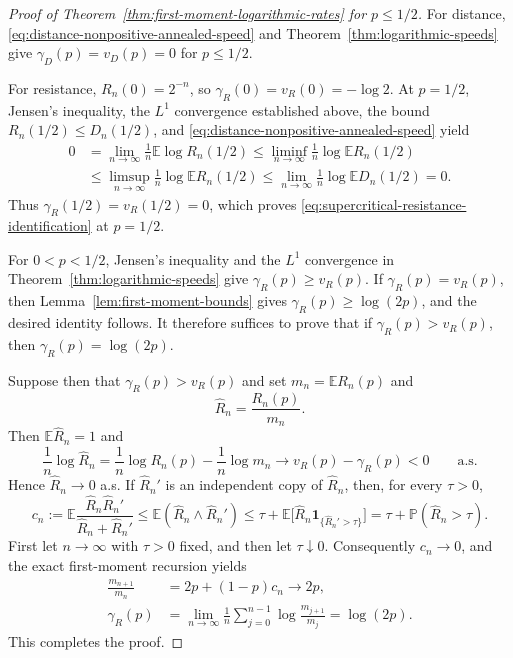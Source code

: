 \documentclass[12pt]{amsart}
\numberwithin{equation}{section}
\theoremstyle{plain}
\theoremstyle{definition}
\newcommand{\E}{\mathbb E}
\newcommand{\Pp}{\mathbb P}
\newcommand{\ind}{\mathbf 1}
\begin{document}
\begin{proof}[Proof of Theorem~\ref{thm:first-moment-logarithmic-rates}
for $p\le 1/2$]
For distance, \eqref{eq:distance-nonpositive-annealed-speed} and
Theorem~\ref{thm:logarithmic-speeds} give
$\gamma_D(p)=v_D(p)=0$ for $p\le1/2$.

For resistance, $R_n(0)=2^{-n}$, so
$\gamma_R(0)=v_R(0)=-\log2$.  At $p=1/2$,
Jensen's inequality, the $L^1$ convergence established above,
the bound $R_n(1/2)\le D_n(1/2)$, and
\eqref{eq:distance-nonpositive-annealed-speed} yield
\[
\begin{aligned}
 0
 &=\lim_{n\to\infty}\frac1n\E\log R_n(1/2)
 \le\liminf_{n\to\infty}\frac1n\log\E R_n(1/2)
 \\ &\le\limsup_{n\to\infty}\frac1n\log\E R_n(1/2)
 \le\lim_{n\to\infty}\frac1n\log\E D_n(1/2)=0.
\end{aligned}
\]
Thus $\gamma_R(1/2)=v_R(1/2)=0$, which proves
\eqref{eq:supercritical-resistance-identification} at $p=1/2$.

For $0<p<1/2$, Jensen's inequality and the $L^1$ convergence in
Theorem~\ref{thm:logarithmic-speeds} give $\gamma_R(p)\ge v_R(p)$.
If $\gamma_R(p)=v_R(p)$, then Lemma~\ref{lem:first-moment-bounds} gives
$\gamma_R(p)\ge\log(2p)$, and the desired identity follows.  It therefore
suffices to prove that if $\gamma_R(p)>v_R(p)$, then
$\gamma_R(p)=\log(2p)$.

Suppose then that $\gamma_R(p)>v_R(p)$ and set
$m_n=\E R_n(p)$ and
\[
 \widehat R_n=\frac{R_n(p)}{m_n}.
\]
Then $\E\widehat R_n=1$ and
\[
 \frac1n\log\widehat R_n
 =\frac1n\log R_n(p)-\frac1n\log m_n
 \longrightarrow v_R(p)-\gamma_R(p)<0
 \qquad\text{a.s.}
\]
Hence $\widehat R_n\to0$ a.s.  If $\widehat R_n'$ is an independent copy of
$\widehat R_n$, then, for every $\tau>0$,
\[
 c_n:=\E\frac{\widehat R_n\widehat R_n'}
                    {\widehat R_n+\widehat R_n'}
 \le \E(\widehat R_n\wedge\widehat R_n')
 \le \tau+\E\bigl[\widehat R_n
                   \ind_{\{\widehat R_n'>\tau\}}\bigr]
 =\tau+\Pp(\widehat R_n>\tau).
\]
First let $n\to\infty$ with $\tau>0$ fixed, and then let $\tau\downarrow0$.
Consequently $c_n\to0$, and the exact first-moment recursion yields
\[
\begin{aligned}
 \frac{m_{n+1}}{m_n}
 &=2p+(1-p)c_n\longrightarrow2p,\\
 \gamma_R(p)
 &=\lim_{n\to\infty}\frac1n
   \sum_{j=0}^{n-1}\log\frac{m_{j+1}}{m_j}
 =\log(2p).
\end{aligned}
\]
This completes the proof.
\end{proof}
\end{document}
